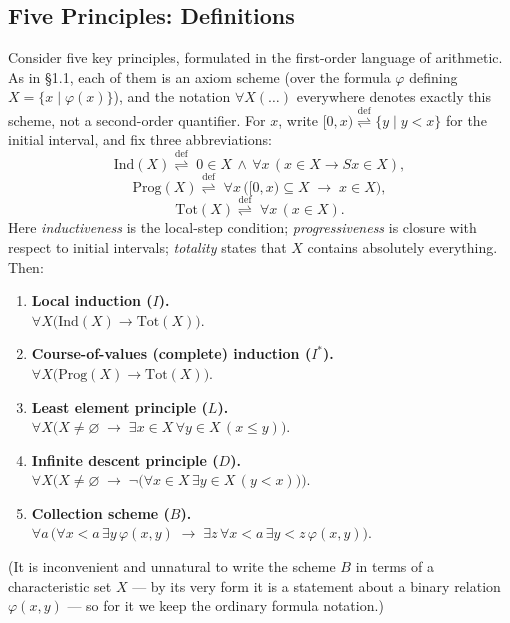 \documentclass[12pt,a4paper]{article}
\theoremstyle{plain}
\theoremstyle{definition}
\newcommand{\ph}{\varphi}
\newcommand{\toinf}{\rightarrow}
\newcommand{\eqdef}{\mathrel{\overset{\mathrm{def}}{\rightleftharpoons}}}
\begin{document}
\subsection{Five Principles: Definitions}
Consider five key principles, formulated in the first-order language of arithmetic. As in §1.1, each of them is an axiom scheme (over the formula $\ph$ defining $X=\{x \mid \ph(x)\}$), and the notation $\forall X(\ldots)$ everywhere denotes exactly this scheme, not a second-order quantifier. For $x$, write $[0,x)\eqdef\{y \mid y<x\}$ for the initial interval, and fix three abbreviations:
$$\mathrm{Ind}(X) \eqdef\; 0\in X \,\land\, \forall x\,(x\in X\toinf Sx\in X),$$
$$\mathrm{Prog}(X) \eqdef\; \forall x\,\big([0,x)\subseteq X\;\toinf\; x\in X\big),$$
$$\mathrm{Tot}(X) \eqdef\; \forall x\,(x\in X).$$
Here \emph{inductiveness} is the local-step condition; \emph{progressiveness} is closure with respect to initial intervals; \emph{totality} states that $X$ contains absolutely everything. Then:
\begin{enumerate}[leftmargin=1.2em, itemindent=0pt, labelsep=0.4em, itemsep=0.7em]
    \item \textbf{Local induction ($I$).} \\ $\forall X\big(\mathrm{Ind}(X)\toinf \mathrm{Tot}(X)\big)$.
    \item \textbf{Course-of-values (complete) induction ($I^*$).} \\ $\forall X\big(\mathrm{Prog}(X)\toinf\mathrm{Tot}(X)\big)$.
    \item \textbf{Least element principle ($L$).} \\ $\forall X\big(X\ne\varnothing \;\toinf\; \exists x\in X\,\forall y\in X\,(x\leqslant y)\big)$.
    \item \textbf{Infinite descent principle ($D$).} \\ $\forall X\big(X\ne\varnothing \;\toinf\; \neg\big(\forall x\in X\,\exists y\in X\,(y<x)\big)\big)$.
    \item \textbf{Collection scheme ($B$).} \\ $\forall a\,\big(\forall x{<}a\,\exists y\,\ph(x,y) \;\toinf\; \exists z\,\forall x{<}a\,\exists y{<}z\,\ph(x,y)\big)$.
\end{enumerate}
(It is inconvenient and unnatural to write the scheme $B$ in terms of a characteristic set $X$ --- by its very form it is a statement about a binary relation $\ph(x,y)$ --- so for it we keep the ordinary formula notation.)
\end{document}
